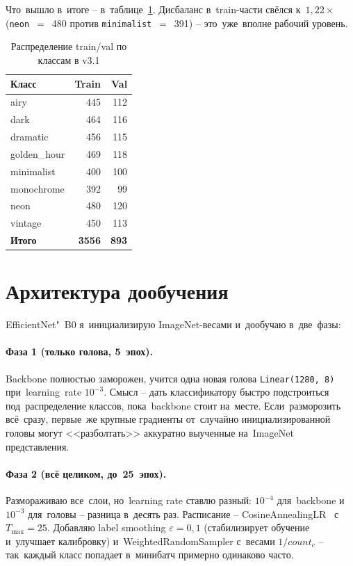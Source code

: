 \documentclass[a4paper,12pt]{diplom}
\begin{document}
Что~вышло в~итоге -- в~таблице~\ref{tab:dataset}. Дисбаланс в~train-части свёлся к~$1{,}22\times$ (\texttt{neon}~$=$~480 против \texttt{minimalist}~$=$~391) -- это~уже~вполне рабочий уровень.

\begin{table}[!ht]
\caption{Распределение train/val по классам в v3.1}
\label{tab:dataset}
\centering
\begin{tabular}{lrr}
\toprule
\textbf{Класс} & \textbf{Train} & \textbf{Val} \\
\midrule
airy        & 445 & 112 \\
dark        & 464 & 116 \\
dramatic    & 456 & 115 \\
golden\_hour& 469 & 118 \\
minimalist  & 400 & 100 \\
monochrome  & 392 &  99 \\
neon        & 480 & 120 \\
vintage     & 450 & 113 \\
\midrule
\textbf{Итого}  & \textbf{3556} & \textbf{893} \\
\bottomrule
\end{tabular}
\end{table}

\section{Архитектура дообучения}
\label{sec:training}

EfficientNet"~B0 я~инициализирую ImageNet-весами и~дообучаю в~две~фазы:

\paragraph{Фаза 1 (только голова, 5~эпох).} Backbone полностью заморожен, учится одна новая голова \verb|Linear(1280, 8)| при~learning~rate $10^{-3}$. Смысл -- дать классификатору быстро подстроиться под~распределение классов, пока~backbone стоит на~месте. Если~разморозить всё~сразу, первые~же крупные градиенты от~случайно инициализированной головы могут <<разболтать>> аккуратно выученные на~ImageNet представления.

\paragraph{Фаза 2 (всё целиком, до~25~эпох).} Размораживаю все~слои, но~learning rate ставлю разный: $10^{-4}$ для~backbone и~$10^{-3}$ для~головы -- разница в~десять раз. Расписание -- CosineAnnealingLR~\cite{Loshchilov:2017} с~$T_{\max}=25$. Добавляю label smoothing $\varepsilon=0{,}1$ (стабилизирует обучение и~улучшает калибровку) и~WeightedRandomSampler с~весами $1/count_c$ -- так~каждый класс попадает в~минибатч примерно одинаково часто.
\end{document}
